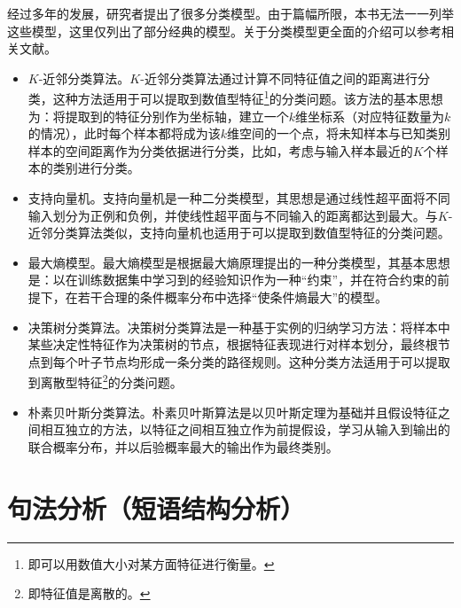 \parinterval 经过多年的发展，研究者提出了很多分类模型。由于篇幅所限，本书无法一一列举这些模型，这里仅列出了部分经典的模型。关于分类模型更全面的介绍可以参考相关文献。

\begin{itemize}
\vspace{0.5em}
\item $K$-近邻分类算法。$K$-近邻分类算法通过计算不同特征值之间的距离进行分类，这种方法适用于可以提取到数值型特征\footnote{即可以用数值大小对某方面特征进行衡量。}的分类问题。该方法的基本思想为：将提取到的特征分别作为坐标轴，建立一个$k$维坐标系（对应特征数量为$k$的情况），此时每个样本都将成为该$k$维空间的一个点，将未知样本与已知类别样本的空间距离作为分类依据进行分类，比如，考虑与输入样本最近的$K$个样本的类别进行分类。
\vspace{0.5em}
\item 支持向量机。支持向量机是一种二分类模型，其思想是通过线性超平面将不同输入划分为正例和负例，并使线性超平面与不同输入的距离都达到最大。与$K$-近邻分类算法类似，支持向量机也适用于可以提取到数值型特征的分类问题。
\vspace{0.5em}
\item 最大熵模型。最大熵模型是根据最大熵原理提出的一种分类模型，其基本思想是：以在训练数据集中学习到的经验知识作为一种“约束”，并在符合约束的前提下，在若干合理的条件概率分布中选择“使条件熵最大”的模型。
\vspace{0.5em}
\item 决策树分类算法。决策树分类算法是一种基于实例的归纳学习方法：将样本中某些决定性特征作为决策树的节点，根据特征表现进行对样本划分，最终根节点到每个叶子节点均形成一条分类的路径规则。这种分类方法适用于可以提取到离散型特征\footnote{即特征值是离散的。}的分类问题。
\vspace{0.5em}
\item 朴素贝叶斯分类算法。朴素贝叶斯算法是以贝叶斯定理为基础并且假设特征之间相互独立的方法，以特征之间相互独立作为前提假设，学习从输入到输出的联合概率分布，并以后验概率最大的输出作为最终类别。
\vspace{0.5em}
\end{itemize}

\sectionnewpage
\section{句法分析（短语结构分析）}

